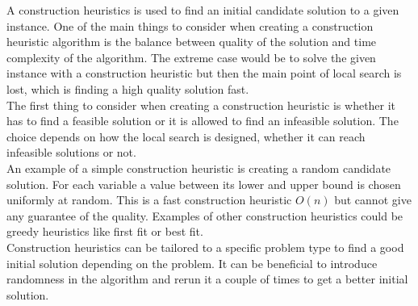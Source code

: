 A construction heuristics is used to find an initial candidate solution to a given instance. One of the main things to 
consider when creating a construction heuristic algorithm is the balance between quality of the solution and time 
complexity of the algorithm. The extreme case would be to solve the given instance with a construction heuristic but 
then the main point of local search is lost, which is finding a high quality solution fast. \\ 
The first thing to consider when creating a construction heuristic is whether it has to find a feasible solution or it 
is allowed to find an infeasible solution. The choice depends on how the local search is designed, whether it can reach 
infeasible solutions or not. \\ 
An example of a simple construction heuristic is creating a random candidate solution. For each variable a value 
between its lower and upper bound is chosen uniformly at random. This is a fast construction heuristic $O(n)$ but 
cannot give any guarantee of the quality. Examples of other construction heuristics could be greedy heuristics like 
first fit or best fit. \\ 
Construction heuristics can be tailored to a specific problem type to find a good initial solution depending on 
the problem. It can be beneficial to introduce randomness in the algorithm and rerun it a couple of times to get a 
better initial solution.